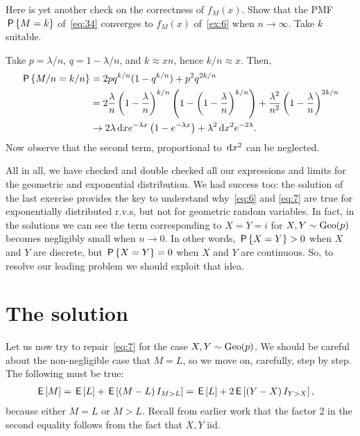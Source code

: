 \documentclass[a4paper,11pt]{article}
\begin{document}
\begin{exercise}
Here is yet another check on the correctness of $f_M(x)$. 
Show that  the PMF $\P{M=k}$ of~\cref{eq:34} converges to $f_M(x)$ of~\cref{ex:6} when $n\to \infty$. Take $k$ suitable.
\begin{solution} Take $p=\lambda/n$,  $q=1-\lambda/n$, and $k \approx x n$, hence $k/n \approx x$. Then,
  \begin{align}
    \label{eq:31}
\P{M/n=k/n}  
&= 2 p q^{k/n}(1-q^{k/n}) + p^2q^{2k/n} \\
&= 2 \frac \lambda n \left(1-\frac \lambda n\right)^{k/n}\left(1-\left(1-\frac \lambda n\right)^{k/n}\right) + \frac{\lambda^2}{n^2}\left(1-\frac \lambda n \right)^{2k/n} \\
&\to 2 \lambda \d x e^{-\lambda x} \left(1 - e^{-\lambda x}\right) + \lambda^{2} \d x^{2}e^{-2\lambda}.\label{eq:37}
  \end{align}
Now observe that the second term, proportional to $\d x^{2}$ can be neglected. 
\end{solution}
\end{exercise}

All in all, we have checked and double checked all our expressions and limits for the geometric and exponential distribution.
We had success too: the solution of the last exercise provides the key to understand why~\eqref{eq:6} and \eqref{eq:7} are true for exponentially distributed r.v.s, but not for geometric random variables.
In fact, in the solutions we can see the term corresponding to $X=Y=i$ for $X,Y\sim \Geo{p}$ becomes negligibly small when $n\to 0$.
In other words, $\P{X=Y}>0$  when $X$ and $Y$ are discrete, but $\P{X=Y}=0$ when  $X$ and $Y$ are continuous.
So, to resolve our leading problem we should exploit that idea.

\section{The solution}
\label{sec:solution}


Let us now try to repair~\cref{eq:7}  for the case $X,Y\sim\Geo{p}$. We should be careful about the non-negligible case that $M=L$, so we move on, carefully, step by step. The following must be true:
\begin{align}
  \label{eq:40}
\E M &= \E L + \E{(M-L) \1{M>L}}  = \E L + 2\E{(Y-X) \1{Y>X}},
\end{align}
because either $M=L$ or $M>L$.
Recall from earlier work that the factor 2 in the second equality follows from the fact that $X,Y$ iid.
\end{document}
